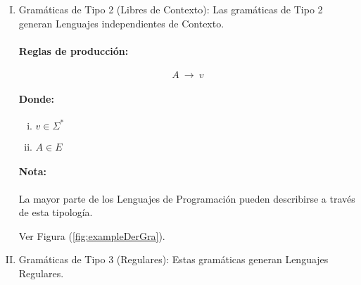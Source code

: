 \begin{enumerate}[I.]
{S = \{$\lambda$\} \\

$ $P$\ = \begin{cases}

$S$\  {\longrightarrow}\ $aSBc$\ |\ $aBC$ \\
  
$bB$\ {\longrightarrow}\ $bb$ \\

$bC$\ {\longrightarrow}\ $bc$ \\

$CB$\ {\longrightarrow}\ $BC$ \\
  
$cC$\ {\longrightarrow}\ $cc$ \\

$aB$\ {\longrightarrow}\ $ab$ \\

\end{cases}$
}
\item Gramáticas de Tipo 2 (Libres de Contexto): Las gramáticas de Tipo 2 generan Lenguajes independientes de Contexto.
{
\paragraph*{Reglas de producción:}

\begin{equation}
A\ {\longrightarrow}\ v 
\end{equation}

\paragraph*{Donde:}

\begin{enumerate}[i.]

\item $v \in \Sigma^*$

\item $A \in E$

\end{enumerate}

\paragraph*{Nota:} La mayor parte de los Lenguajes de Programación pueden describirse a través de esta tipología.

\ejem Ver Figura (\ref{fig:exampleDerGra}). 
}
\item Gramáticas de Tipo 3 (Regulares): Estas gramáticas generan Lenguajes Regulares.
{
}
\end{enumerate}
